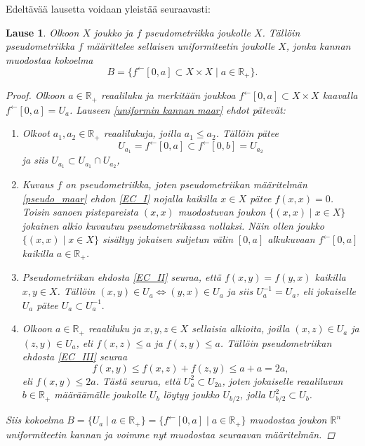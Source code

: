 \documentclass[12pt,a4paper,leqno]{report}
\newcommand{\R}{\mathbb{R}}
\theoremstyle{plain}
\newtheorem{lause}[equation]{Lause}
\theoremstyle{definition}
\theoremstyle{remark}
\begin{document}
\noindent Edeltävää lausetta voidaan yleistää seuraavasti: 
\begin{lause}\label{pseudo_uniformi_maar}
Olkoon $X$ joukko ja $f$ pseudometriikka joukolle $X$. Tällöin pseudometriikka $f$ määrittelee sellaisen uniformiteetin joukolle $X$, jonka kannan muodostaa kokoelma $$B=\{ f^{\leftarrow}[0,a]\subset X\times X\mid a\in\R_+\}.$$
\begin{proof}
Olkoon $a\in\R_+$ reaaliluku ja merkitään 
joukkoa $f^{\leftarrow}[0,a]\subset X\times X$ kaavalla $f^{\leftarrow}[0,a]=U_a$. 
Lauseen \ref{uniformin kannan maar} ehdot pätevät:
\begin{enumerate} [label=(B\arabic*)]
\item %
Olkoot $a_1,a_2\in\R_+$ reaalilukuja, joilla $a_1\leq a_2$. 
Tällöin pätee $$U_{a_1}=f^{\leftarrow}[0,a]\subset f^{\leftarrow}[0,b]=U_{a_2}$$ ja siis $U_{a_1}\subset U_{a_1}\cap U_{a_2}$,
\item%
Kuvaus $f$ on pseudometriikka, joten pseudometriikan määritelmän \ref{pseudo_maar} ehdon \ref{EC_I} nojalla kaikilla $x\in X$ pätee $f(x,x)=0$. 
Toisin sanoen pistepareista $(x,x)$ muodostuvan joukon $\{(x,x)\mid x\in X\}$ jokainen alkio kuvautuu pseudometriikassa nollaksi. Näin ollen joukko $\{(x,x)\mid x\in X\}$ sisältyy jokaisen suljetun välin $[0,a]$ alkukuvaan $f^{\leftarrow}[0,a]$ kaikilla $a\in \R_+$.
\item%
Pseudometriikan ehdosta \ref{EC_II} seuraa, että $f(x,y)=f(y,x)$ kaikilla $x,y\in X$. 
Tällöin $(x,y)\in U_a\Leftrightarrow (y,x)\in U_a$ ja siis $U_a^{-1}=U_a$, eli jokaiselle $U_a$ pätee $U_a\subset U_a^{-1}. $
\item%
Olkoon $a\in\R_+$ reaaliluku ja $x,y,z\in X$ sellaisia alkioita, joilla $(x,z)\in U_a$ ja $(z,y)\in U_a$, eli $f(x,z)\leq a$ ja $f(z,y)\leq a$.
Tällöin pseudometriikan ehdosta \ref{EC_III} seuraa 
$$f(x,y)\leq f(x,z)+f(z,y)\leq a+a=2a,$$ 
eli $f(x,y)\leq 2a$. Tästä seuraa, että $U_a^2\subset U_{2a} $, joten jokaiselle reaaliluvun $b\in\R_+$ määräämälle joukolle $U_b$ löytyy joukko $U_{b/2}$, jolla $U_{b/2}^2\subset U_b$.
\end{enumerate}
Siis kokoelma $B=\{U_a\mid a\in\R_+\}
=\{f^{\leftarrow}[0,a]\mid a\in\R_+\}
$ muodostaa joukon $\R^n$ uniformiteetin kannan ja voimme nyt muodostaa seuraavan määritelmän.
\end{proof}
\end{lause}
\end{document}
